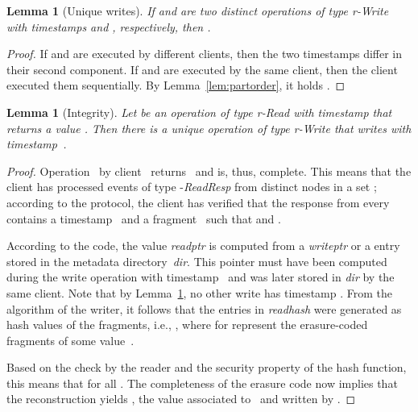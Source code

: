 \documentclass[oribibl]{llncs}
\newtheorem{lemma}[theorem]{Lemma}
\theoremstyle{definition-boldhead}
\newcommand{\var}[1]{\textit{#1}}
\newcommand{\op}[1]{\textsl{#1}}
\newcommand{\dir}{\var{dir}\xspace}
\newcommand{\nodes}{nodes\xspace}
\begin{document}
\begin{lemma}[Unique writes]\label{lem:unqwrites}
  If \opr and \popr are two distinct operations of type
  \var{r}-\op{Write} with timestamps \tsopr and \tspopr, respectively,
  then .
\end{lemma}

\begin{proof}
  If \opr and \popr are executed by different clients, then the two
  timestamps differ in their second component. If \opr and \popr are
  executed by the same client, then the client executed them
  sequentially. By Lemma~\ref{lem:partorder}, it holds .
\end{proof}





\begin{lemma}[Integrity]\label{lem:integr}
  Let  be an operation of type \var{r}-\op{Read} with timestamp
   that returns a value .  Then there is a
  unique operation  of type \var{r}-\op{Write} that writes 
  with timestamp~.
\end{lemma}

\begin{proof}
  Operation~ by client~ returns~ and is, thus, complete.
  This means that the client has processed  events of type
  -\op{ReadResp} from distinct \nodes in a set ;
  according to the protocol, the client has verified that the response
  from every  contains a
  timestamp~ and a fragment~ such that  and .



  According to the code, the value \var{readptr} is computed from a
  \var{writeptr} or a  entry stored in the metadata
  directory~\dir.  This pointer must have been computed during the
  write operation with timestamp~ and was later stored in
  \dir by the same client.  Note that by Lemma~\ref{lem:unqwrites}, no
  other write has timestamp .  From the algorithm of the
  writer, it follows that the entries in \var{readhash} were generated
  as hash values of the fragments, i.e., , where  for  represent the
  erasure-coded fragments of some value~.

  Based on the check by the reader and the security property of the
  hash function, this means that  for all . The completeness of the erasure code now implies
  that the reconstruction yields , the value associated
  to~ and written by .
\end{proof}



\newcommand{\opwi}[1]{\ensuremath{o_{w,#1}}\xspace}
\newcommand{\updatewi}[1]{\dir-\ensuremath{\var{Update}_{w,#1}}\xspace}
\newcommand{\scanwi}[1]{\dir-\ensuremath{\var{Scan}_{w, #1}}\xspace}
\newcommand{\updaterd}{\dir-\ensuremath{\var{Update}_r}\xspace}
\newcommand{\scanrd}{\dir-\ensuremath{\var{Scan}_r}\xspace}
\end{document}
